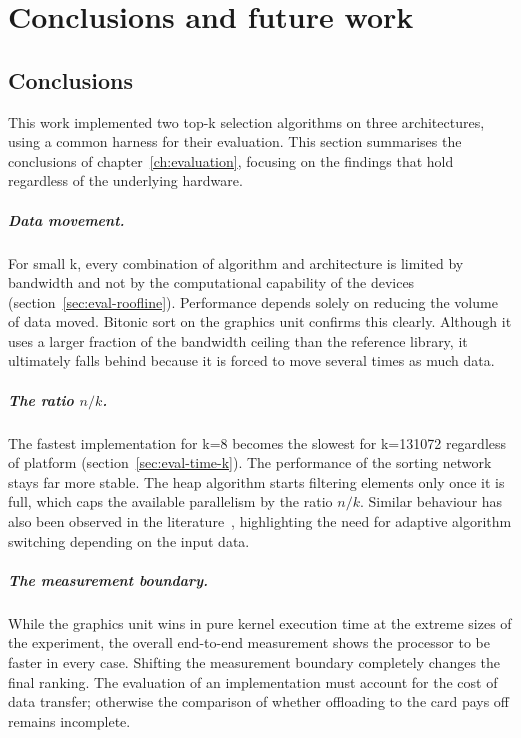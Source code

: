 \chapter{Conclusions and future work}
\label{ch:conclusions}

\section{Conclusions}
\label{sec:concl-summary}

This work implemented two top-k selection algorithms on three architectures,
using a common harness for their evaluation. This section summarises the
conclusions of chapter~\ref{ch:evaluation}, focusing on the findings that hold
regardless of the underlying hardware.

\paragraph{Data movement.} For small k, every combination of algorithm and
architecture is limited by bandwidth and not by the computational capability of
the devices (section~\ref{sec:eval-roofline}). Performance depends solely on
reducing the volume of data moved. Bitonic sort on the graphics unit confirms
this clearly. Although it uses a larger fraction of the bandwidth ceiling than
the reference library, it ultimately falls behind because it is forced to move
several times as much data.

\paragraph{The ratio $n/k$.} The fastest implementation for k=8 becomes the
slowest for k=131072 regardless of platform (section~\ref{sec:eval-time-k}).
The performance of the sorting network stays far more stable. The heap
algorithm starts filtering elements only once it is full, which caps the
available parallelism by the ratio $n/k$. Similar behaviour has also been
observed in the literature~\cite{lin2026adaptivetopk}, highlighting the need
for adaptive algorithm switching depending on the input data.

\paragraph{The measurement boundary.} While the graphics unit wins in pure
kernel execution time at the extreme sizes of the experiment, the overall
end-to-end measurement shows the processor to be faster in every case. Shifting
the measurement boundary completely changes the final ranking. The evaluation
of an implementation must account for the cost of data transfer; otherwise the
comparison of whether offloading to the card pays off remains incomplete.

